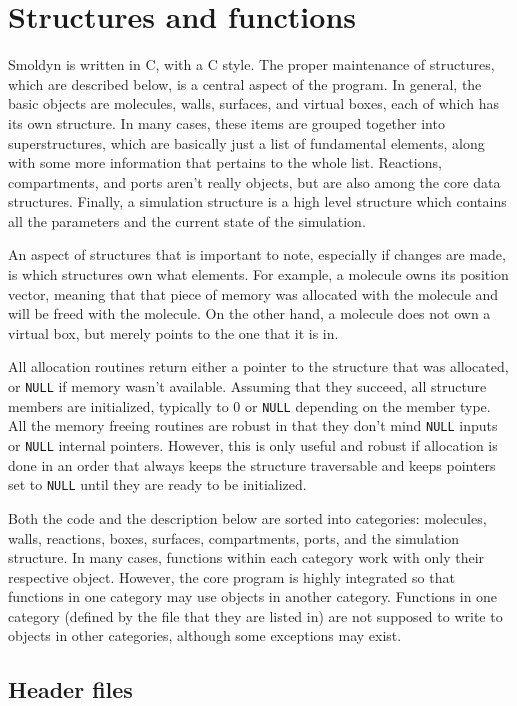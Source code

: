 \documentclass {book}
\begin{document}
\chapter{Structures and functions}

Smoldyn is written in C, with a C style.  The proper maintenance of structures, which are described below, is a central aspect of the program.  In general, the basic objects are molecules, walls, surfaces, and virtual boxes, each of which has its own structure.  In many cases, these items are grouped together into superstructures, which are basically just a list of fundamental elements, along with some more information that pertains to the whole list.  Reactions, compartments, and ports aren't really objects, but are also among the core data structures.  Finally, a simulation structure is a high level structure which contains all the parameters and the current state of the simulation.

An aspect of structures that is important to note, especially if changes are made, is which structures own what elements.  For example, a molecule owns its position vector, meaning that that piece of memory was allocated with the molecule and will be freed with the molecule.  On the other hand, a molecule does not own a virtual box, but merely points to the one that it is in.

All allocation routines return either a pointer to the structure that was allocated, or \texttt{NULL} if memory wasn't available.  Assuming that they succeed, all structure members are initialized, typically to 0 or \texttt{NULL} depending on the member type.  All the memory freeing routines are robust in that they don't mind \texttt{NULL} inputs or \texttt{NULL} internal pointers.  However, this is only useful and robust if allocation is done in an order that always keeps the structure traversable and keeps pointers set to \texttt{NULL} until they are ready to be initialized.

Both the code and the description below are sorted into categories: molecules, walls, reactions, boxes, surfaces, compartments, ports, and the simulation structure.  In many cases, functions within each category work with only their respective object.  However, the core program is highly integrated so that functions in one category may use objects in another category.  Functions in one category (defined by the file that they are listed in) are not supposed to write to objects in other categories, although some exceptions may exist.

\section{Header files}
\end{document}
